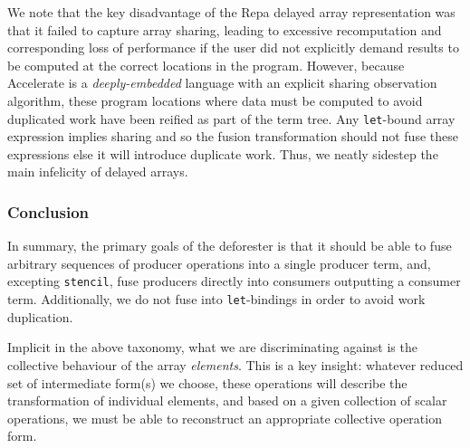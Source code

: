 We note that the key disadvantage of the Repa delayed array representation was
that it failed to capture array sharing, leading to excessive recomputation and
corresponding loss of performance if the user did not explicitly demand results
to be computed at the correct locations in the program. However, because
Accelerate is a \emph{deeply-embedded} language with an explicit sharing
observation algorithm, these program locations where data must be computed to
avoid duplicated work have been reified as part of the term tree. Any
\texttt{let}-bound array expression implies sharing and so the fusion
transformation should not fuse these expressions else it will introduce
duplicate work. Thus, we neatly sidestep the main infelicity of delayed arrays.


\subsubsection{Conclusion}

In summary, the primary goals of the deforester is that it should be able to
fuse arbitrary sequences of producer operations into a single producer term,
and, excepting \texttt{stencil}, fuse producers directly into consumers
outputting a consumer term. Additionally, we do not fuse into
\texttt{let}-bindings in order to avoid work duplication.

Implicit in the above taxonomy, what we are discriminating against is the
collective behaviour of the array \emph{elements}. This is a key insight:
whatever reduced set of intermediate form(s) we choose, these operations will
describe the transformation of individual elements, and based on a given
collection of scalar operations, we must be able to reconstruct an appropriate
collective operation form.

